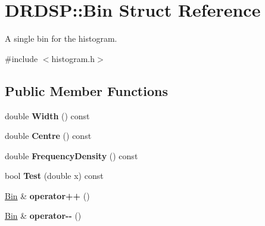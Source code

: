 \hypertarget{struct_d_r_d_s_p_1_1_bin}{\section{D\-R\-D\-S\-P\-:\-:Bin Struct Reference}
\label{struct_d_r_d_s_p_1_1_bin}
}


A single bin for the histogram.  




{\ttfamily \#include $<$histogram.\-h$>$}

\subsection*{Public Member Functions}
\begin{DoxyCompactItemize}
\item 
\hypertarget{struct_d_r_d_s_p_1_1_bin_a81018d4b5c9376ce11f8c330ea1e4ab6}{double {\bfseries Width} () const }\label{struct_d_r_d_s_p_1_1_bin_a81018d4b5c9376ce11f8c330ea1e4ab6}

\item 
\hypertarget{struct_d_r_d_s_p_1_1_bin_ae538982ca6d6a230311844363beccf7c}{double {\bfseries Centre} () const }\label{struct_d_r_d_s_p_1_1_bin_ae538982ca6d6a230311844363beccf7c}

\item 
\hypertarget{struct_d_r_d_s_p_1_1_bin_ab97c729c1b67f6e3e764eee03c0eba9a}{double {\bfseries Frequency\-Density} () const }\label{struct_d_r_d_s_p_1_1_bin_ab97c729c1b67f6e3e764eee03c0eba9a}

\item 
\hypertarget{struct_d_r_d_s_p_1_1_bin_ab9adbac4bcb9819b0bcc08456758a450}{bool {\bfseries Test} (double x) const }\label{struct_d_r_d_s_p_1_1_bin_ab9adbac4bcb9819b0bcc08456758a450}

\item 
\hypertarget{struct_d_r_d_s_p_1_1_bin_a7b0e4edfa0f3708a5564620334ef2f58}{\hyperlink{struct_d_r_d_s_p_1_1_bin}{Bin} \& {\bfseries operator++} ()}\label{struct_d_r_d_s_p_1_1_bin_a7b0e4edfa0f3708a5564620334ef2f58}

\item 
\hypertarget{struct_d_r_d_s_p_1_1_bin_a02ec5f5512126681d907d1190500fe03}{\hyperlink{struct_d_r_d_s_p_1_1_bin}{Bin} \& {\bfseries operator-\/-\/} ()}\label{struct_d_r_d_s_p_1_1_bin_a02ec5f5512126681d907d1190500fe03}

\end{DoxyCompactItemize}
